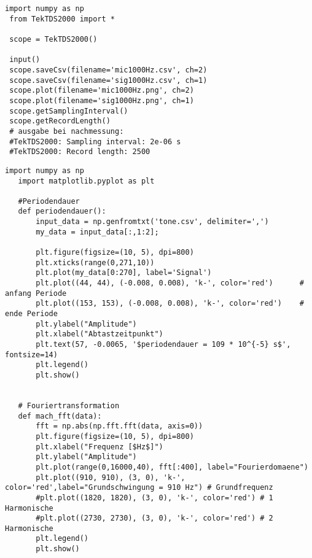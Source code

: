 \begin{lstlisting}[style=PYTHON,frame=single,
 caption=Zum einlesen der Mundharmonika Schwingung
 captionpos=b,
 label=lst:read] 
 import numpy as np
 from TekTDS2000 import *
 
 scope = TekTDS2000()
 
 input()
 scope.saveCsv(filename='mic1000Hz.csv', ch=2)
 scope.saveCsv(filename='sig1000Hz.csv', ch=1)
 scope.plot(filename='mic1000Hz.png', ch=2)
 scope.plot(filename='sig1000Hz.png', ch=1)
 scope.getSamplingInterval()
 scope.getRecordLength()
 # ausgabe bei nachmessung:
 #TekTDS2000: Sampling interval: 2e-06 s
 #TekTDS2000: Record length: 2500
 \end{lstlisting}
 
\newpage
  \begin{lstlisting}[style=PYTHON,frame=single,
   caption=Zum umwandeln der Mundharmonika Schwingung
   captionpos=b,
   label=lst:v1d]
   import numpy as np
   import matplotlib.pyplot as plt
   
   #Periodendauer
   def periodendauer():
       input_data = np.genfromtxt('tone.csv', delimiter=',')
       my_data = input_data[:,1:2];
       
       plt.figure(figsize=(10, 5), dpi=800)
       plt.xticks(range(0,271,10))
       plt.plot(my_data[0:270], label='Signal')
       plt.plot((44, 44), (-0.008, 0.008), 'k-', color='red')      # anfang Periode
       plt.plot((153, 153), (-0.008, 0.008), 'k-', color='red')    # ende Periode
       plt.ylabel("Amplitude")
       plt.xlabel("Abtastzeitpunkt")
       plt.text(57, -0.0065, '$periodendauer = 109 * 10^{-5} s$', fontsize=14)
       plt.legend()
       plt.show()
   
   
   # Fouriertransformation
   def mach_fft(data):
       fft = np.abs(np.fft.fft(data, axis=0))
       plt.figure(figsize=(10, 5), dpi=800)
       plt.xlabel("Frequenz [$Hz$]")
       plt.ylabel("Amplitude")
       plt.plot(range(0,16000,40), fft[:400], label="Fourierdomaene")
       plt.plot((910, 910), (3, 0), 'k-', color='red',label="Grundschwingung = 910 Hz") # Grundfrequenz
       #plt.plot((1820, 1820), (3, 0), 'k-', color='red') # 1 Harmonische
       #plt.plot((2730, 2730), (3, 0), 'k-', color='red') # 2 Harmonische
       plt.legend()
       plt.show()
   \end{lstlisting}